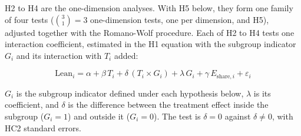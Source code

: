 H2 to H4 are the one-dimension analyses. With H5 below, they form one family of four tests
(\(\binom{3}{1} = 3\) one-dimension tests, one per dimension, and H5), adjusted together with the
Romano-Wolf procedure. Each of H2 to H4 tests one interaction coefficient, estimated in the H1
equation with the subgroup indicator \(G_i\) and its interaction with \(T_i\) added:

\[\mathrm{Lean}_i = \alpha + \beta\, T_i + \delta\,(T_i \times G_i) + \lambda\, G_i + \gamma\, E_{\mathrm{share},i} + \varepsilon_i\]

\(G_i\) is the subgroup indicator defined under each hypothesis below, \(\lambda\) is its coefficient,
and \(\delta\) is the difference between the treatment effect inside the subgroup (\(G_i = 1\)) and
outside it (\(G_i = 0\)). The test is \(\delta = 0\) against \(\delta \neq 0\), with HC2 standard errors.

